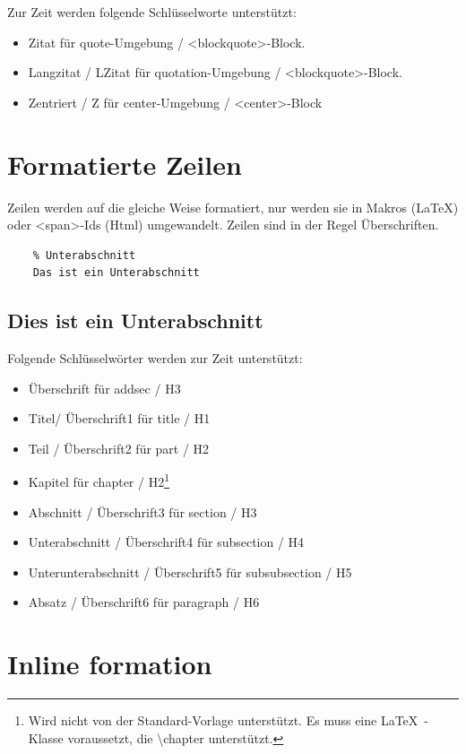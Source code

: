 \documentclass{scrartcl}
\begin{document}
Zur Zeit werden folgende Schlüsselworte unterstützt:

\begin{itemize}
\item Zitat für quote-Umgebung / <blockquote>-Block.
\item Langzitat / LZitat für quotation-Umgebung / <blockquote>-Block.
\item Zentriert / Z für center-Umgebung / <center>-Block
\end{itemize}


\section{Formatierte Zeilen}

Zeilen werden auf die gleiche Weise formatiert, nur werden sie in Makros (LaTeX) oder <span>-Ids (Html) umgewandelt. Zeilen sind in der Regel Überschriften.

\begin{verbatim}
    % Unterabschnitt
    Das ist ein Unterabschnitt
\end{verbatim}


\subsection{Dies ist ein Unterabschnitt}

Folgende Schlüsselwörter werden zur Zeit unterstützt:

\begin{itemize}
\item Überschrift für addsec / H3
\item Titel/ Überschrift1  für title / H1
\item Teil / Überschrift2 für part / H2
\item Kapitel für chapter / H2\footnote{Wird nicht von der Standard-Vorlage unterstützt. Es muss eine \LaTeX\ -Klasse voraussetzt, die \textbackslash chapter unterstützt.}\xspace  
\item Abschnitt / Überschrift3 für section / H3
\item Unterabschnitt / Überschrift4 für subsection / H4
\item Unterunterabschnitt / Überschrift5 für subsubsection / H5
\item Absatz / Überschrift6 für paragraph / H6
\end{itemize}


\section{Inline formation}
\end{document}
